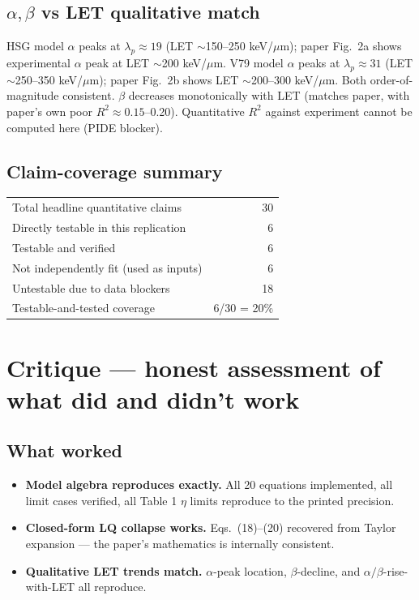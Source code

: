 \documentclass[11pt]{article}
\begin{document}
\subsection{$\alpha,\beta$ vs LET qualitative match}
HSG model $\alpha$ peaks at $\lambda_p \approx 19$ (LET $\sim$150--250 keV/$\mu$m); paper Fig.\ 2a shows experimental $\alpha$ peak at LET $\sim$200 keV/$\mu$m. V79 model $\alpha$ peaks at $\lambda_p \approx 31$ (LET $\sim$250--350 keV/$\mu$m); paper Fig.\ 2b shows LET $\sim$200--300 keV/$\mu$m. Both order-of-magnitude consistent. $\beta$ decreases monotonically with LET (matches paper, with paper's own poor $R^2 \approx 0.15$--0.20). Quantitative $R^2$ against experiment cannot be computed here (PIDE blocker).

\subsection{Claim-coverage summary}

\begin{tabular}{lr}
\toprule
Total headline quantitative claims & 30 \\
Directly testable in this replication & 6 \\
Testable and verified & 6 \\
Not independently fit (used as inputs) & 6 \\
Untestable due to data blockers & 18 \\
\midrule
Testable-and-tested coverage & 6/30 = 20\% \\
\bottomrule
\end{tabular}

\section{Critique --- honest assessment of what did and didn't work}

\subsection{What worked}
\begin{itemize}[nosep,leftmargin=1.4em]
\item \textbf{Model algebra reproduces exactly.} All 20 equations implemented, all limit cases verified, all Table 1 $\eta$ limits reproduce to the printed precision.
\item \textbf{Closed-form LQ collapse works.} Eqs.\ (18)--(20) recovered from Taylor expansion --- the paper's mathematics is internally consistent.
\item \textbf{Qualitative LET trends match.} $\alpha$-peak location, $\beta$-decline, and $\alpha/\beta$-rise-with-LET all reproduce.
\end{itemize}
\end{document}
